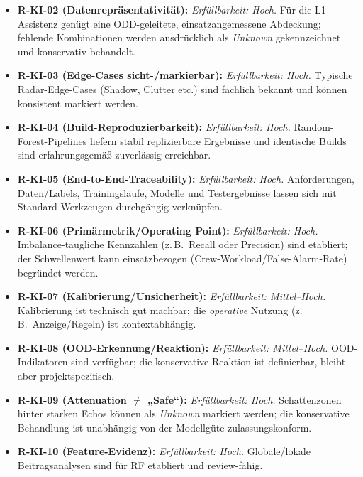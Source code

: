 \begin{itemize}
  \item \textbf{R-KI-02 (Datenrepräsentativität):} \emph{Erfüllbarkeit: Hoch.}
      Für die L1-Assistenz genügt eine ODD-geleitete, einsatzangemessene Abdeckung; fehlende Kombinationen 
      werden ausdrücklich als \emph{Unknown} gekennzeichnet und konservativ behandelt. 

  \item \textbf{R-KI-03 (Edge-Cases sicht-/markierbar):} \emph{Erfüllbarkeit: Hoch.}
        Typische Radar-Edge-Cases (Shadow, Clutter etc.) sind fachlich bekannt und können konsistent markiert werden.

  \item \textbf{R-KI-04 (Build-Reproduzierbarkeit):} \emph{Erfüllbarkeit: Hoch.}
        Random-Forest-Pipelines liefern stabil replizierbare Ergebnisse und identische Builds sind erfahrungsgemäß zuverlässig erreichbar.

  \item \textbf{R-KI-05 (End-to-End-Traceability):} \emph{Erfüllbarkeit: Hoch.}
        Anforderungen, Daten/Labels, Trainingsläufe, Modelle und Testergebnisse lassen sich mit Standard-Werkzeugen 
        durchgängig verknüpfen.

  \item \textbf{R-KI-06 (Primärmetrik/Operating Point):} \emph{Erfüllbarkeit: Hoch.}
        Imbalance-taugliche Kennzahlen (z.\,B.\ Recall oder Precision) sind etabliert; 
        der Schwellenwert kann einsatzbezogen (Crew-Workload/False-Alarm-Rate) begründet werden.

  \item \textbf{R-KI-07 (Kalibrierung/Unsicherheit):} \emph{Erfüllbarkeit: Mittel–Hoch.}
        Kalibrierung ist technisch gut machbar; die \emph{operative} Nutzung (z.\,B.\ Anzeige/Regeln) ist kontextabhängig.

  \item \textbf{R-KI-08 (OOD-Erkennung/Reaktion):} \emph{Erfüllbarkeit: Mittel–Hoch.}
        OOD-Indikatoren sind verfügbar; die konservative Reaktion ist definierbar, bleibt aber projektspezifisch.

  \item \textbf{R-KI-09 (Attenuation \(\neq\) „Safe“):} \emph{Erfüllbarkeit: Hoch.}
        Schattenzonen hinter starken Echos können als \emph{Unknown} markiert werden; 
        die konservative Behandlung ist unabhängig von der Modellgüte zulassungskonform.

  \item \textbf{R-KI-10 (Feature-Evidenz):} \emph{Erfüllbarkeit: Hoch.}
        Globale/lokale Beitragsanalysen sind für RF etabliert und review-fähig.


\end{itemize}
